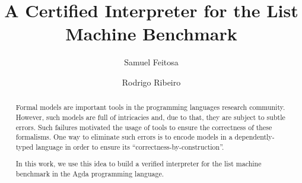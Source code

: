 \documentclass[sigconf]{acmart}
\theoremstyle{definition}
\begin{document}
\title{A Certified Interpreter for the List Machine Benchmark}

\author{Samuel Feitosa}
\authornotemark[1]

\author{Rodrigo Ribeiro}


\begin{abstract}
Formal models are important tools in the programming languages research
community. However, such models are full of intricacies and, due to that,
they are subject to subtle errors. Such failures motivated the usage of
tools to ensure the correctness of these formalisms. One way to eliminate
such errors is to encode models in a dependently-typed language in order
to ensure its ``correctness-by-construction''.

In this work, we use this idea to build a verified interpreter
for the list machine benchmark in the Agda programming language.
\end{abstract}
\end{document}
